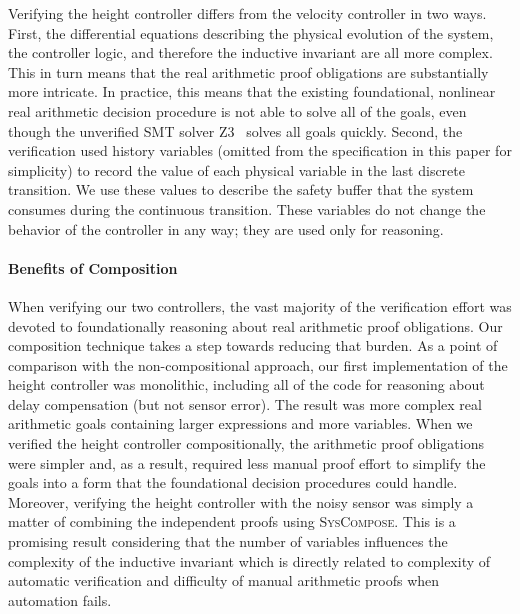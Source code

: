 Verifying the height controller differs from the velocity controller in two
ways.  First, the differential equations describing the physical evolution
of the system, the controller logic, and therefore the inductive invariant
are all more complex.  This in turn means that the real arithmetic proof
obligations are substantially more intricate.  In practice, this means that
the existing foundational, nonlinear real arithmetic decision procedure is
not able to solve all of the goals, even though the unverified SMT solver
Z3~\cite{demoura2008z3} solves all goals quickly.  Second, the verification
used history variables (omitted from the specification in this paper for
simplicity) to record the value of each physical variable in the last
discrete transition.  We use these values to describe the safety buffer
that the system consumes during the continuous transition.  These variables
do not change the behavior of the controller in any way; they are used only
for reasoning.

\paragraph*{Benefits of Composition}
When verifying our two controllers, the vast majority of the verification
effort was devoted to foundationally reasoning about real arithmetic proof
obligations.  Our composition technique takes a step towards reducing that
burden.  As a point of comparison with the non-compositional approach, our
first implementation of the height controller was monolithic, including all
of the code for reasoning about delay compensation (but not sensor error).
The result was more complex real arithmetic goals containing larger
expressions and more variables.  When we verified the height controller
compositionally, the arithmetic proof obligations were simpler and, as a
result, required less manual proof effort to simplify the goals into a form
that the foundational decision procedures could handle.  Moreover,
verifying the height controller with the noisy sensor was simply a matter
of combining the independent proofs using \textsc{SysCompose}.  This is a
promising result considering that the number of variables influences the
complexity of the inductive invariant which is directly related to
complexity of automatic verification and difficulty of manual arithmetic
proofs when automation fails.

